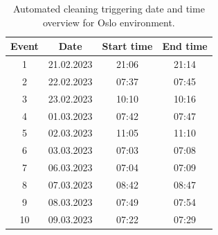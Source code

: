 \begin{table}[H]
\centering
\caption{Automated cleaning triggering date and time overview for Oslo environment.}
\label{tab:AC_dateandtimeOslo}
\begin{tabular}{|c|c|c|c|}
\hline
\textbf{Event} & \textbf{Date} & \textbf{Start time} & \textbf{End time} \\ \hline
1              & 21.02.2023         & 21:06               & 21:14             \\ \hline
2              & 22.02.2023         & 07:37               & 07:45             \\ \hline
3              & 23.02.2023         & 10:10               & 10:16             \\ \hline
4              & 01.03.2023         & 07:42               & 07:47             \\ \hline
5              & 02.03.2023         & 11:05               & 11:10             \\ \hline
6              & 03.03.2023         & 07:03               & 07:08             \\ \hline
7              & 06.03.2023         & 07:04               & 07:09             \\ \hline
8              & 07.03.2023         & 08:42               & 08:47             \\ \hline
9              & 08.03.2023         & 07:49               & 07:54             \\ \hline
10             & 09.03.2023         & 07:22               & 07:29             \\ \hline
\end{tabular}
\end{table}


